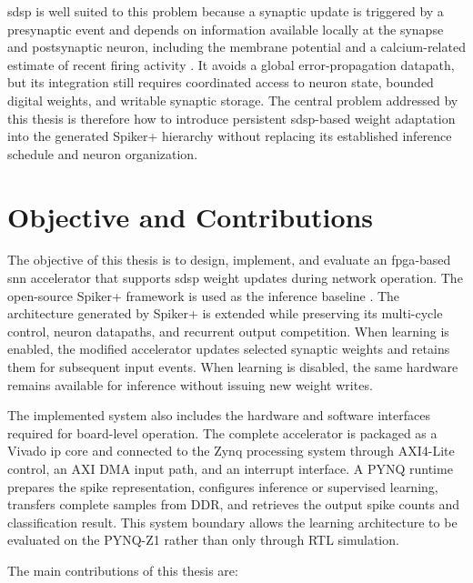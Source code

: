 \Gls{sdsp} is well suited to this problem because a synaptic update is triggered by a presynaptic event and depends on information available locally at the synapse and postsynaptic neuron, including the membrane potential and a calcium-related estimate of recent firing activity \cite{Brader2007}. It avoids a global error-propagation datapath, but its integration still requires coordinated access to neuron state, bounded digital weights, and writable synaptic storage. The central problem addressed by this thesis is therefore how to introduce persistent \gls{sdsp}-based weight adaptation into the generated Spiker+ hierarchy without replacing its established inference schedule and neuron organization.

\section{Objective and Contributions}
\label{subsec:objective-and-contributions}

The objective of this thesis is to design, implement, and evaluate an \gls{fpga}-based \gls{snn} accelerator that supports \gls{sdsp} weight updates during network operation. The open-source Spiker+ framework is used as the inference baseline \cite{Carpegna2025}. The architecture generated by Spiker+ is extended while preserving its multi-cycle control, neuron datapaths, and recurrent output competition. When learning is enabled, the modified accelerator updates selected synaptic weights and retains them for subsequent input events. When learning is disabled, the same hardware remains available for inference without issuing new weight writes.

The implemented system also includes the hardware and software interfaces required for board-level operation. The complete accelerator is packaged as a Vivado \gls{ip} core and connected to the Zynq processing system through AXI4-Lite control, an AXI DMA input path, and an interrupt interface. A PYNQ runtime prepares the spike representation, configures inference or supervised learning, transfers complete samples from DDR, and retrieves the output spike counts and classification result. This system boundary allows the learning architecture to be evaluated on the PYNQ-Z1 rather than only through RTL simulation.

The main contributions of this thesis are:

